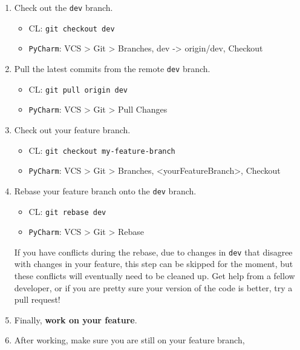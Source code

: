 \begin{enumerate}
    \item Check out the \verb|dev| branch.
    \label{itm:rebase_start}
    \begin{itemize} 
        \item CL: \verb|git checkout dev|
        \item \verb|PyCharm|: VCS > Git > Branches, dev -> origin/dev, Checkout 
    \end{itemize} 
    \item Pull the latest commits from the remote \verb|dev| branch.
    \begin{itemize} 
        \item CL: \verb|git pull origin dev|
        \item \verb|PyCharm|: VCS > Git > Pull Changes 
    \end{itemize} 
    \item Check out your feature branch.
    \begin{itemize} 
        \item CL: \verb|git checkout my-feature-branch|
        \item \verb|PyCharm|: VCS > Git > Branches, <yourFeatureBranch>, Checkout 
    \end{itemize} 
    \item Rebase your feature branch onto the \verb|dev| branch. 
    \label{itm:rebase_end}
    \begin{itemize} 
        \item CL: \verb|git rebase dev| 
        \item \verb|PyCharm|: VCS > Git > Rebase
    \end{itemize} 
    If you have conflicts during the rebase, 
    due to changes in \verb|dev| that disagree with changes in your feature,
    this step can be skipped for the moment,
    but these conflicts will eventually need to be cleaned up.
    Get help from a fellow developer, 
    or if you are pretty sure your version of the code is better,
    try a pull request!
    \item Finally, \textbf{work on your feature}. 
    \item After working, make sure you are still on your feature branch, 

\end{enumerate}
